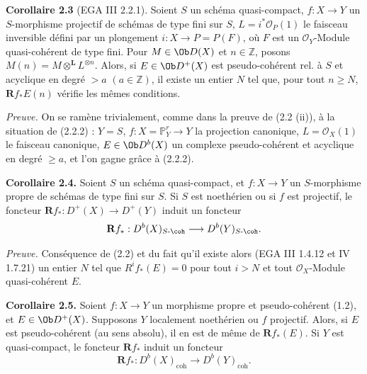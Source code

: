 \textbf{Corollaire 2.3} (EGA III 2.2.1). Soient \(S\) un schéma quasi-compact, \(f:X\to Y\) un \(S\)-morphisme projectif de schémas de type fini sur \(S\), \(L=i^*\mathcal O_P(1)\) le faisceau inversible défini par un plongement \(i:X\to P=P(F)\), où \(F\) est un \(\mathcal O_Y\)-Module quasi-cohérent de type fini. Pour \(M\in\Ob D(X)\) et \(n\in\mathbb Z\), posons \(M(n)=M\otimes^{\mathbf L} L^{\otimes n}\). Alors, si \(E\in\Ob D^+(X)\) est pseudo-cohérent rel. à \(S\) et acyclique en degré \(>a\) \((a\in\mathbb Z)\), il existe un entier \(N\) tel que, pour tout \(n\geq N\), \(\mathbf Rf_*E(n)\) vérifie les mêmes conditions.

\emph{Preuve.} On se ramène trivialement, comme dans la preuve de (2.2 (ii)), à la situation de (2.2.2) : \(Y=S\), \(f:X=\mathbb P^r_Y\to Y\) la projection canonique, \(L=\mathcal O_X(1)\) le faisceau canonique, \(E\in\Ob D^b(X)\) un complexe pseudo-cohérent et acyclique en degré \(\geq a\), et l'on gagne grâce à (2.2.2).

\textbf{Corollaire 2.4.} Soient \(S\) un schéma quasi-compact, et \(f:X\to Y\) un \(S\)-morphisme propre de schémas de type fini sur \(S\). Si \(S\) est noethérien ou si \(f\) est projectif, le foncteur \(\mathbf Rf_*:D^+(X)\longrightarrow D^+(Y)\) induit un foncteur
\[
  \mathbf Rf_*:D^b(X)_{S\text{-}\coh}\longrightarrow D^b(Y)_{S\text{-}\coh}.
\]

\emph{Preuve.} Conséquence de (2.2) et du fait qu'il existe alors (EGA III 1.4.12 et IV 1.7.21) un entier \(N\) tel que \(R^if_*(E)=0\) pour tout \(i>N\) et tout \(\mathcal O_X\)-Module quasi-cohérent \(E\).

\textbf{Corollaire 2.5.} Soient \(f:X\to Y\) un morphisme propre et pseudo-cohérent (1.2), et \(E\in\Ob D^+(X)\). Supposons \(Y\) localement noethérien ou \(f\) projectif. Alors, si \(E\) est pseudo-cohérent (au sens absolu), il en est de même de \(\mathbf Rf_*(E)\). Si \(Y\) est quasi-compact, le foncteur \(\mathbf Rf_*\) induit un foncteur
\[
  \mathbf Rf_*:D^b(X)_{\mathrm{coh}}\longrightarrow D^b(Y)_{\mathrm{coh}}.
\]

